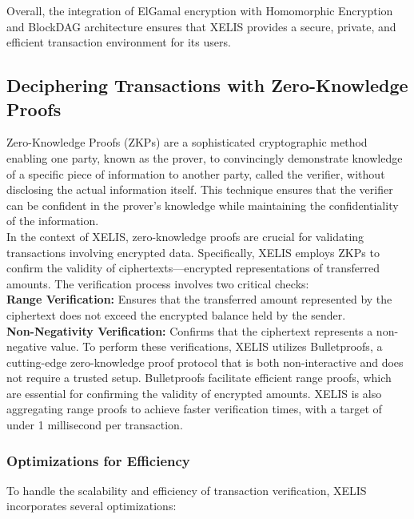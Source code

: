 \documentclass[12pt,a4paper,twocolumn]{article}
\begin{document}
Overall, the integration of ElGamal encryption with Homomorphic Encryption and BlockDAG architecture ensures that XELIS provides a secure, private, and efficient transaction environment for its users.\\

\subsection{Deciphering Transactions with Zero-Knowledge Proofs}

Zero-Knowledge Proofs (ZKPs) are a sophisticated cryptographic method enabling one party, known as the prover, to convincingly demonstrate knowledge of a specific piece of information to another party, called the verifier, without disclosing the actual information itself. This technique ensures that the verifier can be confident in the prover's knowledge while maintaining the confidentiality of the information.\\

In the context of XELIS, zero-knowledge proofs are crucial for validating transactions involving encrypted data. Specifically, XELIS employs ZKPs to confirm the validity of ciphertexts—encrypted representations of transferred amounts. The verification process involves two critical checks:\\

\textbf{Range Verification:} Ensures that the transferred amount represented by the ciphertext does not exceed the encrypted balance held by the sender.\\

\textbf{Non-Negativity Verification:} Confirms that the ciphertext represents a non-negative value.
To perform these verifications, XELIS utilizes Bulletproofs, a cutting-edge zero-knowledge proof protocol that is both non-interactive and does not require a trusted setup. Bulletproofs facilitate efficient range proofs, which are essential for confirming the validity of encrypted amounts. XELIS is also aggregating range proofs to achieve faster verification times, with a target of under 1 millisecond per transaction.\\

\subsubsection{Optimizations for Efficiency}

To handle the scalability and efficiency of transaction verification, XELIS incorporates several optimizations:\\
\end{document}
